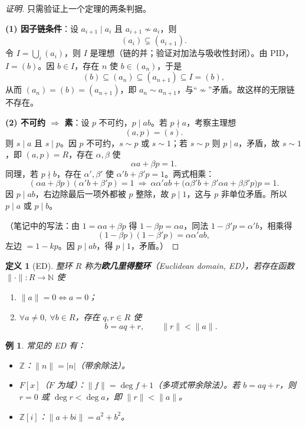 \documentclass[11pt,a4paper]{ctexart}
\newtheorem*{definition}{定义}
\newtheorem*{example}{例}
\theoremstyle{remark}
\begin{document}
\begin{proof}[证明]
只需验证上一个定理的两条判据。

\textbf{(1) 因子链条件}：设 $a_{i+1}\mid a_i$ 且 $a_{i+1}\nsim a_i$，则
\[
(a_i)\subsetneq(a_{i+1}).
\]
令 $I=\bigcup_i(a_i)$，则 $I$ 是理想（链的并；验证对加法与吸收性封闭）。由 PID，$I=(b)$。因 $b\in I$，存在 $n$ 使 $b\in(a_n)$，于是
\[
(b)\subseteq(a_n)\subseteq(a_{n+1})\subseteq I=(b),
\]
从而 $(a_n)=(b)=(a_{n+1})$，即 $a_n\sim a_{n+1}$，与“$\nsim$”矛盾。故这样的无限链不存在。

\textbf{(2) 不可约 $\Rightarrow$ 素}：设 $p$ 不可约，$p\mid ab$。若 $p\nmid a$，考察主理想
\[
(a,p)=(s).
\]
则 $s\mid a$ 且 $s\mid p$。因 $p$ 不可约，$s\sim p$ 或 $s\sim 1$；若 $s\sim p$ 则 $p\mid a$，矛盾，故 $s\sim 1$，即 $(a,p)=R$，存在 $\alpha,\beta$ 使
\[
\alpha a+\beta p=1 .
\]
同理，若 $p\nmid b$，存在 $\alpha',\beta'$ 使 $\alpha'b+\beta'p=1$。两式相乘：
\[
(\alpha a+\beta p)(\alpha'b+\beta'p)=1
\ \Longrightarrow\ \alpha\alpha' ab+\bigl(\alpha\beta'b+\beta'\alpha a+\beta\beta'p\bigr)p=1 .
\]
因 $p\mid ab$，右边除最后一项外都被 $p$ 整除，故 $p\mid 1$，这与 $p$ 非单位矛盾。所以 $p\mid a$ 或 $p\mid b$。

（笔记中的写法：由 $1=\alpha a+\beta p$ 得 $1-\beta p=\alpha a$，同法 $1-\beta'p=\alpha'b$，相乘得
\[
(1-\beta p)(1-\beta'p)=\alpha\alpha'ab ,
\]
左边 $=1-kp$。因 $p\mid ab$，得 $p\mid 1$，矛盾。）
\end{proof}

\begin{definition}[ED]
整环 $R$ 称为\textbf{欧几里得整环}（Euclidean domain, ED），若存在函数 $\|\cdot\|:R\to\mathbb{N}$ 使
\begin{enumerate}
    \item $\|a\|=0\iff a=0$；
    \item $\forall a\neq 0,\ \forall b\in R$，存在 $q,r\in R$ 使
    \[
    b=aq+r,\qquad \|r\|<\|a\| .
    \]
\end{enumerate}
\end{definition}

\begin{example}
常见的 ED 有：
\begin{itemize}
    \item $\mathbb{Z}$：$\|n\|=|n|$（带余除法）。
    \item $F[x]$（$F$ 为域）：$\|f\|=\deg f+1$（多项式带余除法）。若 $b=aq+r$，则 $r=0$ 或 $\deg r<\deg a$，即 $\|r\|<\|a\|$。
    \item $\mathbb{Z}[i]$：$\|a+bi\|=a^{2}+b^{2}$。
\end{itemize}
\end{example}
\end{document}

